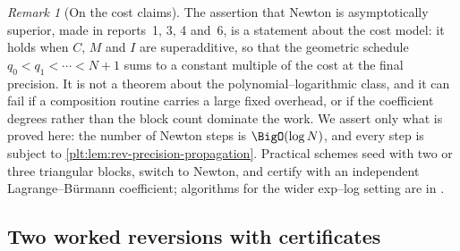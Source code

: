 \documentclass[11pt,oneside]{article}
\theoremstyle{plain}
\theoremstyle{definition}
\theoremstyle{remark}
\newtheorem{remark}[theorem]{Remark}
\begin{document}
\begin{remark}[On the cost claims]
\label{plt:rmk:rev-cost-caveat}
The assertion that Newton is asymptotically superior, made in reports~1, 3, 4
and~6, is a statement about the cost model: it holds when \(C\), \(M\) and
\(I\) are superadditive, so that the geometric schedule \(q_0<q_1<\cdots<N+1\)
sums to a constant multiple of the cost at the final precision.  It is not a
theorem about the polynomial--logarithmic class, and it can fail if a
composition routine carries a large fixed overhead, or if the coefficient
degrees rather than the block count dominate the work.  We assert only what is
proved here: the number of Newton steps is \(\BigO(\log N)\), and every step is
subject to \cref{plt:lem:rev-precision-propagation}.  Practical schemes seed
with two or three triangular blocks, switch to Newton, and certify with an
independent Lagrange--B\"urmann coefficient; algorithms for the wider exp--log
setting are in
\cite{salvy-shackell-1998,salvy-shackell-1999,vanderhoeven-book}.
\end{remark}

\subsection{Two worked reversions with certificates}
\label{plt:sec:rev-worked}
\end{document}
